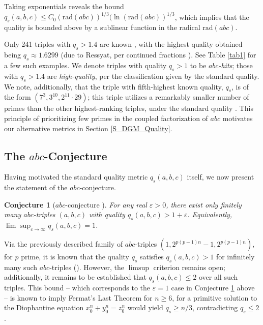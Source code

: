 \documentclass[11pt,letterpaper]{amsart}
\newtheorem{conjecture}[theorem]{Conjecture}
\newcommand{\eps}{\varepsilon}
\def\eps{\varepsilon}
\begin{document}
Taking exponentials reveals the bound $q_s(a, b, c) \leq C_0 (\mathrm{rad}(abc))^{1/3} (\ln(\text{rad}(abc))^{1/3}$, which implies that the quality is bounded above by a sublinear function in the radical $\text{rad}(abc)$.

Only 241 triples with $q_s>1.4$ are known \cite{desmit2022}, with the highest quality obtained being $q_s\approx 1.6299$ (due to Ressyat, per continued fractions \cite{waldschmidt2015,horst2010}). See Table \ref{tab1} for a few such examples. We denote triples with quality $q_s>1$ to be \emph{$abc$-hits}; those with $q_s>1.4$ are \emph{high-quality}, per the classification given by the standard quality. We note, additionally, that the triple with fifth-highest known quality, $q_s$, is of the form $(7^3, 3^{10}, 2^{11} \cdot 29)$; this triple utilizes a remarkably smaller number of primes than the other highest-ranking triples, under the standard quality \cite{deweger1989}. This principle of prioritizing few primes in the coupled factorization of $abc$ motivates our alternative metrics in Section \ref{S_DGM_Quality}.

\subsection{The $abc$-Conjecture}
Having motivated the standard quality metric $q_s(a, b, c)$ itself, we now present the statement of the $abc$-conjecture.

\begin{conjecture}[$abc$-conjecture \cite{oesterle1988, masser1985}]\label{C_abc_conjecture}
For any real $\varepsilon > 0$, there exist only finitely many $abc$-triples $(a,b,c)$ with quality $q_s(a, b, c) > 1 + \varepsilon$. Equivalently, $\lim\sup_{c \rightarrow \infty} q_s(a, b, c) = 1$.
\end{conjecture}

Via the previously described family of $abc$-triples \newline $(1, 2^{p( p - 1)n} - 1, 2^{p(p - 1)n})$, for $p$ prime, it is known that the quality $q_s$ satisfies $q_s(a,b,c)>1$ for infinitely many such $abc$-triples (\cite{waldschmidt2015}). However, the $\limsup$ criterion remains open; additionally, it remains to be established that \newline $q_s(a, b, c) \leq 2$ over all such triples.  This bound – which corresponds to the $\eps = 1$ case in Conjecture \ref{C_abc_conjecture} above – is known to imply Fermat's Last Theorem for $n \ge 6$, for a primitive solution to the Diophantine equation $x_0^n+y_0^n=z_0^n$ would yield $q_s\ge n/3$, contradicting $q_s \leq 2$ \cite{wiles1995, waldschmidt2015}.
\end{document}
